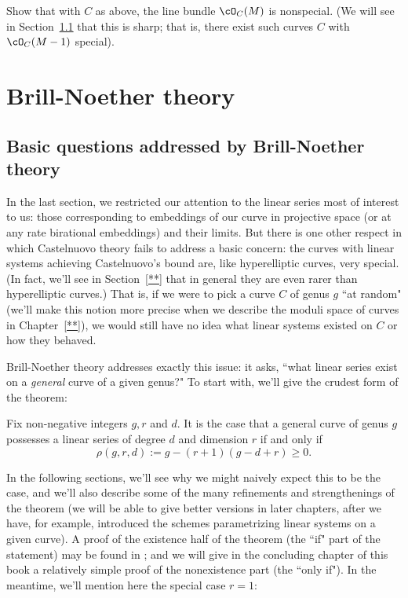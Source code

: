 \begin{exercise}
Show that with $C$ as above, the line bundle $\cO_C(M)$ is nonspecial. (We will see in Section~\ref{} that this is sharp; that is, there exist such curves $C$ with $\cO_C(M-1)$ special).
\end{exercise}

\section{Brill-Noether theory}
\subsection{Basic questions addressed by Brill-Noether theory}

In the last section, we restricted our attention to the linear series most of interest to us: those corresponding to embeddings of our curve in projective space (or at any rate birational embeddings) and their limits. But there is one other respect in which Castelnuovo theory fails to address a basic concern: the curves with linear systems achieving Castelnuovo's bound are, like hyperelliptic curves, very special. (In fact, we'll see in Section~\ref{**} that in general they are even rarer than hyperelliptic curves.) That is, if we were to pick a curve $C$ of genus $g$ ``at random" (we'll make this notion more precise when we describe the moduli space of curves in Chapter~\ref{**}), we would still have no idea what linear systems existed on $C$ or how they behaved.

Brill-Noether theory addresses exactly this issue: it asks, ``what linear series exist on a \emph{general} curve of a given genus?" To start with, we'll give the crudest form of the theorem:

\begin{theorem}\label{basic BN}
Fix non-negative integers $g, r$ and $d$. It is the case that a general curve of genus $g$ possesses a linear series of degree $d$ and dimension $r$ if and only if
$$
\rho(g,r,d) := g - (r+1)(g-d+r) \geq 0.
$$
\end{theorem}

In the following sections, we'll see why we might naively expect this to be the case, and we'll also describe some of the many refinements and strengthenings of the theorem (we will be able to give better versions in later chapters, after we have, for example, introduced the schemes parametrizing linear systems on a given curve). A proof of the existence half of the theorem (the ``if" part of the statement) may be found in \cite{3264}; and we will give in the concluding chapter of this book a relatively simple proof of the nonexistence part (the ``only if"). In the meantime, we'll mention here the special case $r=1$:

